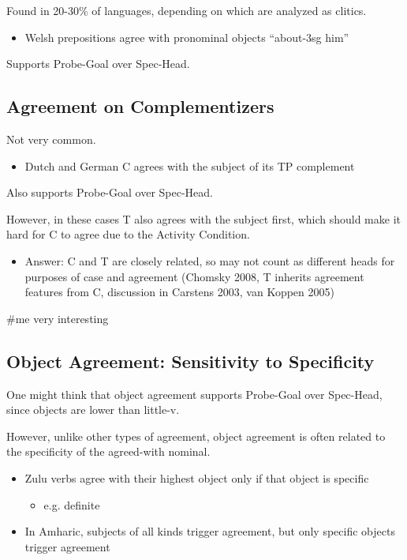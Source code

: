 Found in 20-30\% of languages, depending on which are analyzed as clitics.

\begin{itemize}
  \item Welsh prepositions agree with pronominal objects ``about-3sg him''
\end{itemize}

Supports Probe-Goal over Spec-Head.

\subsection*{Agreement on Complementizers}

Not very common.

\begin{itemize}
  \item Dutch and German C agrees with the subject of its TP complement
\end{itemize}

Also supports Probe-Goal over Spec-Head.

However, in these cases T also agrees with the subject first, which should make it hard for C to agree due to the Activity Condition.

\begin{itemize}
  \item Answer: C and T are closely related, so may not count as different heads for purposes of case and agreement (Chomsky 2008, T inherits agreement features from C, discussion in Carstens 2003, van Koppen 2005)
\end{itemize}
\#me very interesting

\subsection*{Object Agreement: Sensitivity to Specificity}

One might think that object agreement supports Probe-Goal over Spec-Head, since objects are lower than little-v.

However, unlike other types of agreement, object agreement is often related to the specificity of the agreed-with nominal.

\begin{itemize}
  \item Zulu verbs agree with their highest object only if that object is specific
  \begin{itemize}
    \item e.g. definite
  \end{itemize}
  \item In Amharic, subjects of all kinds trigger agreement, but only specific objects trigger agreement
\end{itemize}

